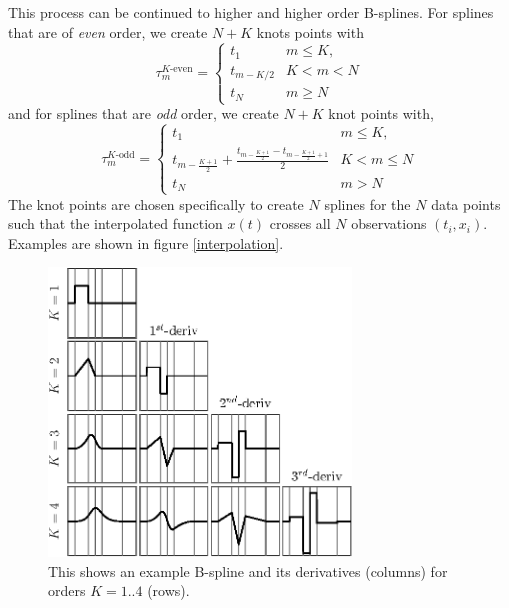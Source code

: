 \documentclass[twocol]{ametsoc}
\begin{document}
This process can be continued to higher and higher order B-splines. For splines that are of \emph{even} order, we create $N+K$ knots points with
\begin{equation}
\tau_m^{\text{$K$-even}} = \begin{cases}
t_1      	& \text{$m \leq K$}, \\
t_{m-K/2}	& \text{$K < m < N$}\\
t_N 		& \text{$m \geq N$}
\end{cases}
\label{even-knots}
\end{equation}
and for splines that are \emph{odd} order, we create $N+K$ knot points with,
\begin{equation}
\tau_m^{\text{$K$-odd}} = \begin{cases}
t_1      	& \text{$m \leq K$}, \\
t_{m-\frac{K+1}{2}} + \frac{t_{m-\frac{K+1}{2}}-t_{m-\frac{K+1}{2}+1}}{2}	& \text{$K < m \leq N$}\\
t_N 		& \text{$m > N$}
\end{cases}
\label{odd-knots}
\end{equation}
The knot points are chosen specifically to create $N$ splines for the $N$ data points such that the interpolated function $x(t)$ crosses all $N$ observations $(t_i,x_i)$. Examples are shown in figure \ref{interpolation}.

\begin{figure}
  \centerline{\includegraphics[width=19pc,angle=0]{bsplines}}
  \caption{This shows an example B-spline and its derivatives (columns) for orders $K=1..4$ (rows).}
  \label{bsplines}
\end{figure}
\end{document}
